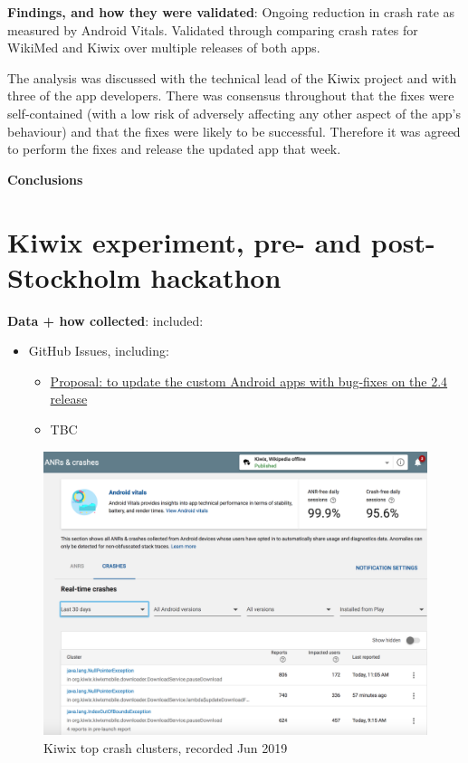 \textbf{Findings, and how they were validated}: 
Ongoing reduction in crash rate as measured by Android Vitals. Validated through comparing crash rates for WikiMed and Kiwix over multiple releases of both apps.

The analysis was discussed with the technical lead of the Kiwix project and with three of the app developers. There was consensus throughout that the fixes were self-contained (with a low risk of adversely affecting any other aspect of the app's behaviour) and that the fixes were likely to be successful. Therefore it was agreed to perform the fixes and release the updated app that week.


\textbf{Conclusions}



\section[Kiwix experiment]{Kiwix experiment, pre- and post- Stockholm hackathon}

\textbf{Data + how collected}: included:
\begin{itemize}
    \item GitHub Issues, including:
    \begin{itemize}
        \item \href{https://github.com/kiwix/kiwix-android/issues/1426}{Proposal: to update the custom Android apps with bug-fixes on the 2.4 release}
        \item TBC
    \end{itemize}
    
\end{itemize}

\begin{figure}
    \centering
    \includegraphics{images/android-vitals-screenshots/kiwix/Example-crash-clusters 10-jun-2019.png}
    \caption{Kiwix top crash clusters, recorded  Jun 2019}
    \label{fig:example-kiwix-crash-clusters-10-jun-2019}
\end{figure}

